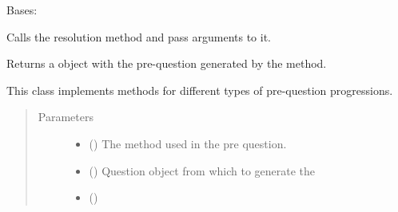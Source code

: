 \documentclass[letterpaper,10pt,english]{sphinxmanual}
\begin{document}
\begin{fulllineitems}
\label{\detokenize{index:birdears.prequestion.PreQuestion}}
Bases: 

\begin{fulllineitems}
\label{\detokenize{index:birdears.prequestion.PreQuestion.__call__}}
Calls the resolution method and pass arguments to it.

Returns a  object with the pre-question generated by
the method.

\end{fulllineitems}


\begin{fulllineitems}
\label{\detokenize{index:birdears.prequestion.PreQuestion.__init__}}
This class implements methods for different types of pre-question
progressions.
\begin{quote}\begin{description}
\item[{Parameters}] \leavevmode\begin{itemize}
\item {} 
 () \textendash{} The method used in the pre question.

\item {} 
 () \textendash{} Question object from which to generate the

\item {} 
 () \textendash{} 

\end{itemize}

\end{description}\end{quote}

\end{fulllineitems}


\end{fulllineitems}
\end{document}
